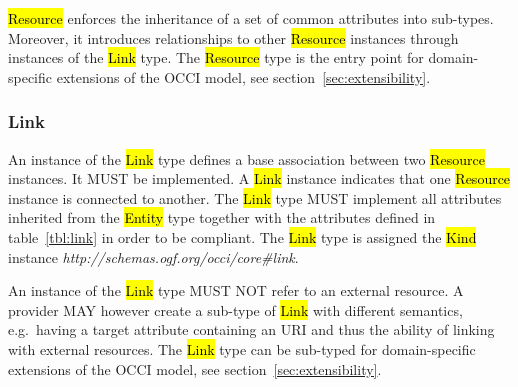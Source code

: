 \documentclass[10pt,a4paper,british]{article}
\begin{document}

\hl{Resource} enforces the inheritance of a set of common attributes into
sub-types. Moreover, it introduces relationships to other \hl{Resource}
instances through instances of the \hl{Link} type.
%
The \hl{Resource} type is the entry point for domain-specific extensions of the
OCCI model, see section~\ref{sec:extensibility}.

\subsubsection{Link}
\label{sec:link}
An instance of the \hl{Link} type defines a base association between two
\hl{Resource} instances. It MUST be implemented. A \hl{Link} instance indicates
that one \hl{Resource} instance is connected to another.
%
The \hl{Link} type MUST implement all attributes inherited from the
\hl{Entity} type together with the attributes defined in table~\ref{tbl:link}
in order to be compliant.
%
The \hl{Link} type is assigned the \hl{Kind} instance
\textit{http://schemas.ogf.org/occi/core\#link}.


An instance of the \hl{Link} type MUST NOT refer to an external resource.  A
provider MAY however create a sub-type of \hl{Link} with different semantics,
e.g.~having a target attribute containing an URI and thus the ability of linking
with external resources.
%
The \hl{Link} type can be sub-typed for domain-specific extensions of the
OCCI model, see section~\ref{sec:extensibility}.
\end{document}
